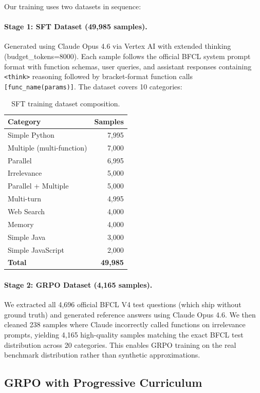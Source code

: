\documentclass[10pt,twocolumn]{article}
\begin{document}
Our training uses two datasets in sequence:

\paragraph{Stage 1: SFT Dataset (49,985 samples).} Generated using Claude Opus 4.6 via Vertex AI with extended thinking (budget\_tokens=8000). Each sample follows the official BFCL system prompt format with function schemas, user queries, and assistant responses containing \texttt{<think>} reasoning followed by bracket-format function calls \texttt{[func\_name(params)]}. The dataset covers 10 categories:

\begin{table}[!htbp]
\centering
\caption{SFT training dataset composition.}
\label{tab:dataset}
\begin{tabular}{lr}
\toprule
\textbf{Category} & \textbf{Samples} \\
\midrule
Simple Python & 7,995 \\
Multiple (multi-function) & 7,000 \\
Parallel & 6,995 \\
Irrelevance & 5,000 \\
Parallel + Multiple & 5,000 \\
Multi-turn & 4,995 \\
Web Search & 4,000 \\
Memory & 4,000 \\
Simple Java & 3,000 \\
Simple JavaScript & 2,000 \\
\midrule
\textbf{Total} & \textbf{49,985} \\
\bottomrule
\end{tabular}
\end{table}

\paragraph{Stage 2: GRPO Dataset (4,165 samples).} We extracted all 4,696 official BFCL V4 test questions (which ship without ground truth) and generated reference answers using Claude Opus 4.6. We then cleaned 238 samples where Claude incorrectly called functions on irrelevance prompts, yielding 4,165 high-quality samples matching the exact BFCL test distribution across 20 categories. This enables GRPO training on the real benchmark distribution rather than synthetic approximations.

\subsection{GRPO with Progressive Curriculum}
\end{document}
